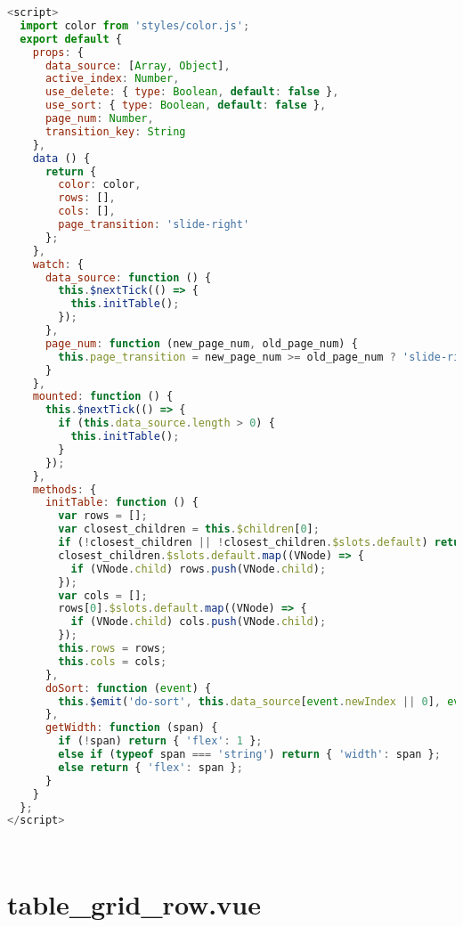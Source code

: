 \begin{lstlisting}[language=JavaScript]
<script>
  import color from 'styles/color.js';
  export default {
    props: {
      data_source: [Array, Object],
      active_index: Number,
      use_delete: { type: Boolean, default: false },
      use_sort: { type: Boolean, default: false },
      page_num: Number,
      transition_key: String
    },
    data () {
      return {
        color: color,
        rows: [],
        cols: [],
        page_transition: 'slide-right'
      };
    },
    watch: {
      data_source: function () {
        this.$nextTick(() => {
          this.initTable();
        });
      },
      page_num: function (new_page_num, old_page_num) {
        this.page_transition = new_page_num >= old_page_num ? 'slide-right' : 'slide-left';
      }
    },
    mounted: function () {
      this.$nextTick(() => {
        if (this.data_source.length > 0) {
          this.initTable();
        }
      });
    },
    methods: {
      initTable: function () {
        var rows = [];
        var closest_children = this.$children[0];
        if (!closest_children || !closest_children.$slots.default) return;
        closest_children.$slots.default.map((VNode) => {
          if (VNode.child) rows.push(VNode.child);
        });
        var cols = [];
        rows[0].$slots.default.map((VNode) => {
          if (VNode.child) cols.push(VNode.child);
        });
        this.rows = rows;
        this.cols = cols;
      },
      doSort: function (event) {
        this.$emit('do-sort', this.data_source[event.newIndex || 0], event.newIndex || 0, event.oldIndex);
      },
      getWidth: function (span) {
        if (!span) return { 'flex': 1 };
        else if (typeof span === 'string') return { 'width': span };
        else return { 'flex': span };
      }
    }
  };
</script>
\end{lstlisting}



\begin{lstlisting}[language=JavaScript]

\end{lstlisting}




\begin{lstlisting}[language=JavaScript]

\end{lstlisting}

\section{table\_grid\_row.vue}

